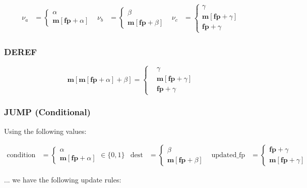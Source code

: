 \documentclass{article}
\theoremstyle{definition}
\begin{document}
\begin{align*}
\nu_a &= 
\begin{cases}
\alpha \\
\textbf{m}[\textbf{fp} + \alpha]
\end{cases}
&
\nu_b &= 
\begin{cases}
\beta \\
\textbf{m}[\textbf{fp} + \beta]
\end{cases}
&
\nu_c &= 
\begin{cases}
\gamma \\
\textbf{m}[\textbf{fp} + \gamma]  \\
\textbf{fp} + \gamma
\end{cases}
\end{align*}


\subsubsection{DEREF}

$$
\textbf{m}[\textbf{m}[\textbf{fp} + \alpha] + \beta] = 
\begin{cases}
& \gamma \\
& \textbf{m}[\textbf{fp} + \gamma]   \\
& \textbf{fp} + \gamma

\end{cases}
$$

\subsubsection{JUMP (Conditional)}

Using the following values:

\begin{align*}
\text{condition} &= 
\begin{cases}
\alpha \\
\textbf{m}[\textbf{fp} + \alpha]
\end{cases} \in \{0, 1\}
&
\text{dest} &= 
\begin{cases}
\beta \\
\textbf{m}[\textbf{fp} + \beta]
\end{cases}
&
\text{updated\_fp} &=
\begin{cases}
\textbf{fp} + \gamma \\
\textbf{m}[\textbf{fp} + \gamma]
\end{cases}
\end{align*}

... we have the following update rules:
\end{document}
